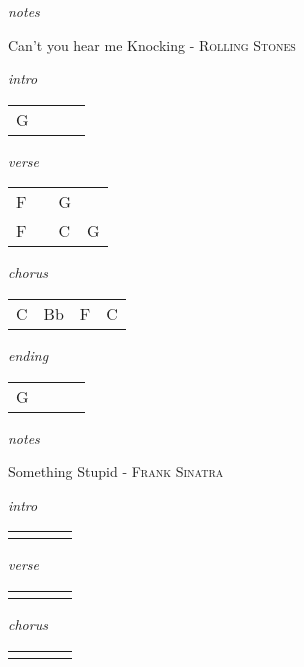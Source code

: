 \documentclass[12pt]{article}
\begin{document}
\textit{notes}

\newpage

{\Huge Can't you hear me Knocking} {\huge - \textsc{Rolling Stones}}

\huge
\textit{intro}

\begin{tabular}{|P{1.25in}|P{1.25in}|P{1.25in}|P{1.25in}|}
  G &   &   &   \\
\end{tabular}

\textit{verse}

\begin{tabular}{|P{1.25in}|P{1.25in}|P{1.25in}|P{1.25in}|}
  F &   & G  &   \\
  F &   & C  & G
\end{tabular}

\textit{chorus}

\begin{tabular}{|P{1.25in}|P{1.25in}|P{1.25in}|P{1.25in}|}
  C & Bb  & F  &  C  \\
\end{tabular}

\textit{ending}

\begin{tabular}{|P{1.25in}|P{1.25in}|P{1.25in}|P{1.25in}|}
  G &   &   &   \\
\end{tabular}

\textit{notes}

\newpage

{\Huge Something Stupid} {\huge - \textsc{Frank Sinatra}}

\huge
\textit{intro}

\begin{tabular}{|P{1.25in}|P{1.25in}|P{1.25in}|P{1.25in}|}
    &   &   &   \\
\end{tabular}

\textit{verse}

\begin{tabular}{|P{1.25in}|P{1.25in}|P{1.25in}|P{1.25in}|}
    &   &   &   \\
\end{tabular}

\textit{chorus}

\begin{tabular}{|P{1.25in}|P{1.25in}|P{1.25in}|P{1.25in}|}
    &   &   &   \\
\end{tabular}
\end{document}
